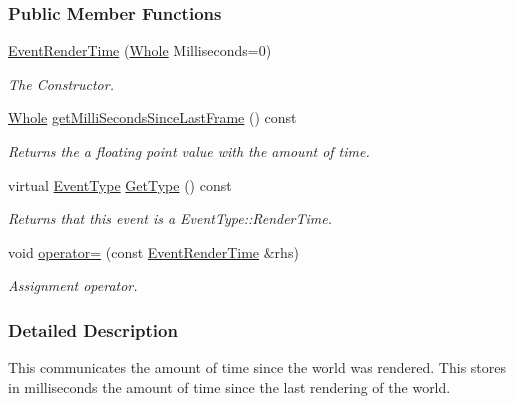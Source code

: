 \subsubsection*{Public Member Functions}
\begin{DoxyCompactItemize}
\item 
\hyperlink{classphys_1_1EventRenderTime_a104e523bc0d33c013aedab7fe10176b3}{EventRenderTime} (\hyperlink{namespacephys_a460f6bc24c8dd347b05e0366ae34f34a}{Whole} Milliseconds=0)
\begin{DoxyCompactList}\small\item\em The Constructor. \item\end{DoxyCompactList}\item 
\hyperlink{namespacephys_a460f6bc24c8dd347b05e0366ae34f34a}{Whole} \hyperlink{classphys_1_1EventRenderTime_a0227bea32aeeb214ef9abc17e55fa8eb}{getMilliSecondsSinceLastFrame} () const 
\begin{DoxyCompactList}\small\item\em Returns the a floating point value with the amount of time. \item\end{DoxyCompactList}\item 
virtual \hyperlink{classphys_1_1EventBase_a5e6a8564e127f654123f0bf6a2751923}{EventType} \hyperlink{classphys_1_1EventRenderTime_a160ca55bf9e5a2ae80dab82eab88baf5}{GetType} () const 
\begin{DoxyCompactList}\small\item\em Returns that this event is a EventType::RenderTime. \item\end{DoxyCompactList}\item 
void \hyperlink{classphys_1_1EventRenderTime_a329a34e064ab7f67c5c9eff517a560fc}{operator=} (const \hyperlink{classphys_1_1EventRenderTime}{EventRenderTime} \&rhs)
\begin{DoxyCompactList}\small\item\em Assignment operator. \item\end{DoxyCompactList}\end{DoxyCompactItemize}


\subsubsection{Detailed Description}
This communicates the amount of time since the world was rendered. This stores in milliseconds the amount of time since the last rendering of the world. 

